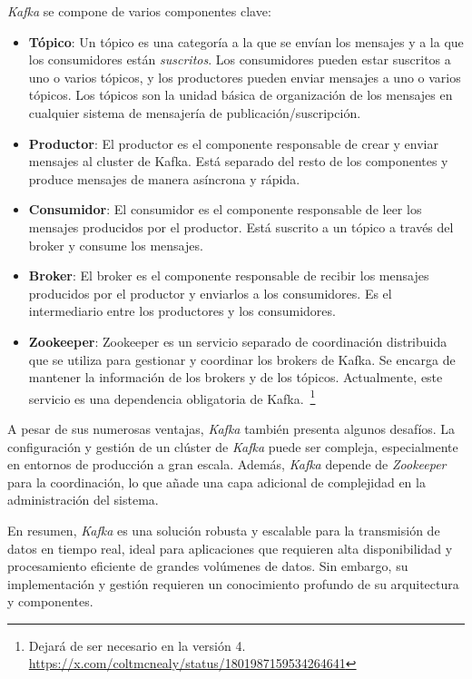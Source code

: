 \textit{Kafka} se compone de varios componentes clave:

\begin{itemize}
    \item \textbf{Tópico}: Un tópico es una categoría a la que se envían los
		mensajes y a la que los consumidores están \textit{suscritos}. Los
		consumidores pueden estar suscritos a uno o varios tópicos, y los
		productores pueden enviar mensajes a uno o varios tópicos. Los tópicos
		son la unidad básica de organización de los mensajes en cualquier
		sistema de mensajería de publicación/suscripción.
    \item \textbf{Productor}: El productor es el componente responsable de crear
		y enviar mensajes al cluster de Kafka. Está separado del resto de los
		componentes y produce mensajes de manera asíncrona y rápida.
    \item \textbf{Consumidor}: El consumidor es el componente responsable de
		leer los mensajes producidos por el productor. Está suscrito a un tópico
		a través del broker y consume los mensajes.
    \item \textbf{Broker}: El broker es el componente responsable de recibir los
		mensajes producidos por el productor y enviarlos a los consumidores. Es
		el intermediario entre los productores y los consumidores.
    \item \textbf{Zookeeper}: Zookeeper es un servicio separado de coordinación
		distribuida que se utiliza para gestionar y coordinar los brokers de
		Kafka. Se encarga de mantener la información de los brokers y de los
		tópicos. Actualmente, este servicio es una dependencia obligatoria de
		Kafka.~\footnote{
			Dejará de ser necesario en la versión 4.
			\url{https://x.com/coltmcnealy/status/1801987159534264641}
		}
\end{itemize}

A pesar de sus numerosas ventajas, \textit{Kafka} también presenta algunos
desafíos. La configuración y gestión de un clúster de \textit{Kafka} puede ser
compleja, especialmente en entornos de producción a gran escala. Además,
\textit{Kafka} depende de \textit{Zookeeper} para la coordinación, lo que añade
una capa adicional de complejidad en la administración del sistema.

En resumen, \textit{Kafka} es una solución robusta y escalable para la
transmisión de datos en tiempo real, ideal para aplicaciones que requieren alta
disponibilidad y procesamiento eficiente de grandes volúmenes de datos. Sin
embargo, su implementación y gestión requieren un conocimiento profundo de su
arquitectura y componentes.


